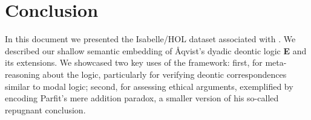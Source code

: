 \documentclass[11pt,a4paper]{article}
\begin{document}
\section{Conclusion}

In this document we presented the Isabelle/HOL dataset associated with
\cite{J68}. We described our shallow semantic embedding of \AA qvist's dyadic deontic logic  {\bf E} and its extensions. We showcased two key uses of the framework: first, for meta-reasoning about the logic, particularly for verifying deontic correspondences similar to modal logic; second, for assessing ethical arguments, exemplified by encoding Parfit's mere addition paradox, a smaller version of his so-called repugnant conclusion.


\end{document}
